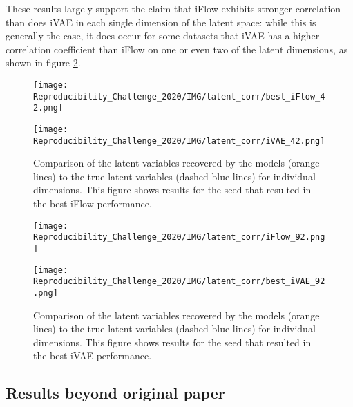 These results largely support the claim that iFlow exhibits stronger correlation than does iVAE in each single dimension of the latent space: while this is generally the case, it does occur for some datasets that iVAE has a higher correlation coefficient than iFlow on one or even two of the latent dimensions, as shown in figure \ref{fig:latentcorr2}.

\begin{figure}[!htbp]
    \centering
    \begin{minipage}[b]{\textwidth}
        \centering
       \texttt{[image: Reproducibility\_Challenge\_2020/IMG/latent\_corr/best\_iFlow\_42.png]}
    \end{minipage}
    \begin{minipage}[b]{\textwidth}
    \centering
       \texttt{[image: Reproducibility\_Challenge\_2020/IMG/latent\_corr/iVAE\_42.png]}
    \end{minipage}
    \caption{Comparison of the latent variables recovered by the models (orange lines) to the true latent variables (dashed blue lines) for individual dimensions. This figure shows results for the seed that resulted in the best iFlow performance.}
    \label{fig:latentcorr1}
\end{figure}

\begin{figure}[!htbp]
    \centering
    \begin{minipage}[b]{\textwidth}
        \centering
       \texttt{[image: Reproducibility\_Challenge\_2020/IMG/latent\_corr/iFlow\_92.png]}
    \end{minipage}
    \begin{minipage}[b]{\textwidth}
    \centering
       \texttt{[image: Reproducibility\_Challenge\_2020/IMG/latent\_corr/best\_iVAE\_92.png]}
    \end{minipage}
    \caption{Comparison of the latent variables recovered by the models (orange lines) to the true latent variables (dashed blue lines) for individual dimensions. This figure shows results for the seed that resulted in the best iVAE performance.}
    \label{fig:latentcorr2}
\end{figure}

\newpage

\subsection{Results beyond original paper}
 
